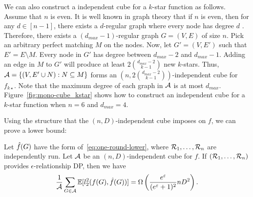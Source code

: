 We can also construct 
a independent cube for 
a $k$-star function 
as follows. 
Assume that $n$ is even. 
It is well known in graph theory that if $n$ is even, then 
for any $d\in[n-1]$, there exists a 
$d$-regular graph where every node has degree $d$ \cite{Ganesan_arXiv18}. 
Therefore, there exists a 
$(d_{max}-1)$-regular graph $G=(V,E)$ 
of size $n$. 
Pick an arbitrary perfect matching $M$ on the nodes. Now, let 
$G' = (V,E')$ such that $E' = E \setminus M$. 
Every node in $G'$ has degree between $d_{max}-2$ and $d_{max}-1$. 
Adding an edge in $M$ to $G'$ will produce at least
$2\binom{d_{max}-2}{k-1}$ new $k$-stars.
Thus, $\mathcal{A} = \{(V, E' \cup N): 
N \subseteq M\}$ forms an
$(n, 2\binom{d_{max}-2}{k-1})$-independent cube for $f_{k\star}$. 
Note that the maximum degree of each graph in $\mathcal{A}$ is at most $d_{max}$. 
Figure~\ref{fig:mono-cube_kstar} shows how to construct an independent cube for a $k$-star function when $n=6$ and $d_{max}=4$. 

Using the structure that the $(n,D)$-independent cube imposes on $f$,
we can prove a lower bound:
\begin{theorem}\label{thm:lower-bound}
  Let 
  $\hat{f}(G)$ 
  have the form of~\eqref{eq:one-round-lower}, 
  where $\mathcal{R}_1, \ldots, \mathcal{R}_n$ are independently run.
  Let $\cal{A}$ be an $(n,D)$-independent cube for $f$. 
  If 
  $(\mathcal{R}_1, \ldots, \mathcal{R}_n)$ 
  provides 
  $\epsilon$-relationship DP, 
  then 
  we have
  \[
    \frac{1}{\mathcal{A}} \sum_{G \in \mathcal{A}} \mathbb{E}[l_2^2(f(G), \hat{f}(G))] =
    \Omega\left(\frac{e^{\varepsilon}}{(e^{\varepsilon}+1)^2}nD^2\right).
  \]
\end{theorem}

